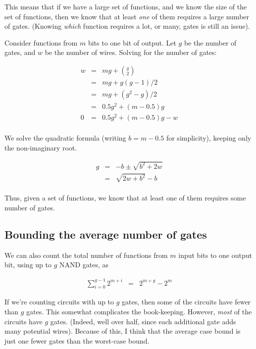 \documentclass[12pt]{article}
\theoremstyle{definition}
\begin{document}
This means that if we have a large set of functions, and we know the size of
the set of functions, then we know that at least {\em one} of them requires
a large number of gates. (Knowing {\em which} function requires a lot, or many,
gates is still an issue).

Consider functions from $m$ bits to one bit of output.
Let $g$ be the number of gates, and $w$ be the number of wires.
Solving for the number of gates:

\begin{eqnarray*}
w & = & mg + {g \choose 2} \\
  & = & mg + g(g-1)/2 \\
  & = & mg + (g^2 - g) / 2 \\
  & = & 0.5g^2 + (m-0.5)g \\
0 & = & 0.5g^2 + (m-0.5)g - w \\
\end{eqnarray*}

We solve the quadratic formula (writing $b = m-0.5$ for simplicity), keeping
only the non-imaginary root.

\begin{eqnarray*}
g & = & -b \pm \sqrt{ b^2 + 2w} \\
  & = & {\sqrt {2w + b^2}} - b \\
\end{eqnarray*}

Thus, given a set of functions, we know that at least one of them requires
some number of gates.

\subsection*{Bounding the average number of gates}

We can also count the total number of functions from $m$ input bits to one
output bit, using up to $g$ NAND gates, as

\begin{eqnarray*}
\sum_{i=0}^{g-1} 2^{m+i} & = & 2^{m+g} - 2^m
\end{eqnarray*}

If we're counting circuits with up to $g$ gates, then some of the circuits
have fewer than $g$ gates. This somewhat complicates the book-keeping.
However, {\em most} of the
circuits have $g$ gates. (Indeed, well over half, since each additional
gate adds many potential wires). Because of this, I think that the
average case bound is just one fewer gates than the worst-case bound.
\end{document}
